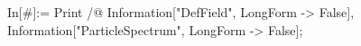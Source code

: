 In[\#]:= Print /@ {Information["DefField", LongForm -> False], Information["ParticleSpectrum", LongForm -> False]}; 